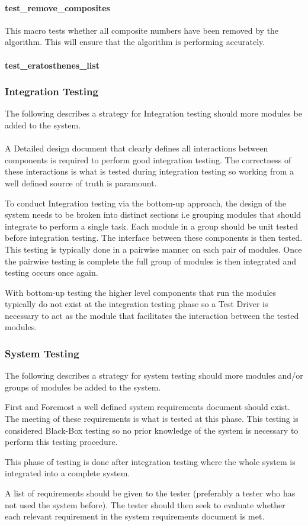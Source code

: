 \documentclass[]{article}
\begin{document}
\paragraph{test\_remove\_composites}
This macro tests whether all composite numbers have been removed by the algorithm. This will ensure that the algorithm is performing accurately.

\paragraph{test\_eratosthenes\_list}

\subsubsection{Integration Testing}
The following describes a strategy for Integration testing should more modules be added to the system.

\paragraph{}
A Detailed design document that clearly defines all interactions between components is required to perform good integration testing. The correctness of these interactions is what is tested during integration testing so working from a well defined source of truth is paramount.

To conduct Integration testing via the bottom-up approach, the design of the system needs to be broken into distinct sections i.e grouping modules that should integrate to perform a single task. Each module in a group should be unit tested before integration testing. The interface between these components is then tested. This testing is typically done in a pairwise manner on each pair of modules. Once the pairwise testing is complete the full group of modules is then integrated and testing occurs once again. 

With bottom-up testing the higher level components that run the modules typically do not exist at the integration testing phase so a Test Driver is necessary to act as the module that facilitates the interaction between the tested modules.

\subsubsection{System Testing}

The following describes a strategy for system testing should more modules and/or groups of modules be added to the system.

First and Foremost a well defined system requirements document should exist. The meeting of these requirements is what is tested at this phase. This testing is considered Black-Box testing so no prior knowledge of the system is necessary to perform this testing procedure.

This phase of testing is done after integration testing where the whole system is integrated into a complete system.

A list of requirements should be given to the tester (preferably a tester who has not used the system before). The tester should then seek to evaluate whether each relevant requirement in the system requirements document is met. 
\end{document}
